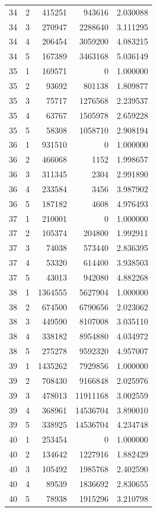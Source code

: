\begin{longtable}{rrrrr}
34 & 2 & 415251 & 943616 & 2.030088 \\
34 & 3 & 270947 & 2288640 & 3.111295 \\
34 & 4 & 206454 & 3059200 & 4.083215 \\
34 & 5 & 167389 & 3463168 & 5.036149 \\
35 & 1 & 169571 & 0 & 1.000000 \\
35 & 2 & 93692 & 801138 & 1.809877 \\
35 & 3 & 75717 & 1276568 & 2.239537 \\
35 & 4 & 63767 & 1505978 & 2.659228 \\
35 & 5 & 58308 & 1058710 & 2.908194 \\
36 & 1 & 931510 & 0 & 1.000000 \\
36 & 2 & 466068 & 1152 & 1.998657 \\
36 & 3 & 311345 & 2304 & 2.991890 \\
36 & 4 & 233584 & 3456 & 3.987902 \\
36 & 5 & 187182 & 4608 & 4.976493 \\
37 & 1 & 210001 & 0 & 1.000000 \\
37 & 2 & 105374 & 204800 & 1.992911 \\
37 & 3 & 74038 & 573440 & 2.836395 \\
37 & 4 & 53320 & 614400 & 3.938503 \\
37 & 5 & 43013 & 942080 & 4.882268 \\
38 & 1 & 1364555 & 5627904 & 1.000000 \\
38 & 2 & 674500 & 6790656 & 2.023062 \\
38 & 3 & 449590 & 8107008 & 3.035110 \\
38 & 4 & 338182 & 8954880 & 4.034972 \\
38 & 5 & 275278 & 9592320 & 4.957007 \\
39 & 1 & 1435262 & 7929856 & 1.000000 \\
39 & 2 & 708430 & 9166848 & 2.025976 \\
39 & 3 & 478013 & 11911168 & 3.002559 \\
39 & 4 & 368961 & 14536704 & 3.890010 \\
39 & 5 & 338925 & 14536704 & 4.234748 \\
40 & 1 & 253454 & 0 & 1.000000 \\
40 & 2 & 134642 & 1227916 & 1.882429 \\
40 & 3 & 105492 & 1985768 & 2.402590 \\
40 & 4 & 89539 & 1836692 & 2.830655 \\
40 & 5 & 78938 & 1915296 & 3.210798 \\

\end{longtable}
